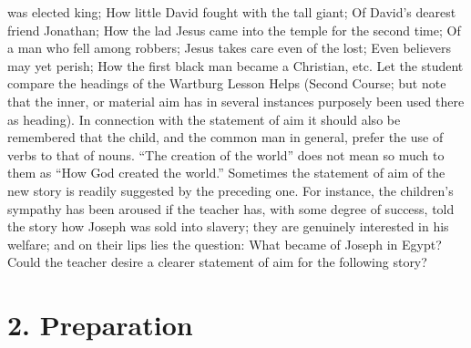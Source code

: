 was elected king; How little David fought with the tall giant; Of David’s dearest friend Jonathan; How the lad Jesus came into the temple for the second time; Of a man who fell among robbers; Jesus takes care even of the lost; Even believers may yet perish; How the first black man became a Christian, etc. Let the student compare the headings of the Wartburg Lesson Helps (Second Course; but note that the inner, or material aim has in several instances purposely been used there as heading). In connection with the statement of aim it should also be remembered that the child, and the common man in general, prefer the use of verbs to that of nouns. “The creation of the world” does not mean so much to them as “How God created the world.” Sometimes the statement of aim of the new story is readily suggested by the preceding one. For instance, the children’s sympathy has been aroused if the teacher has, with some degree of success, told the story how Joseph was sold into slavery; they are genuinely interested in his welfare; and on their lips lies the question: What became of Joseph in Egypt? Could the teacher desire a clearer statement of aim for the following story?

\section{2. Preparation}

